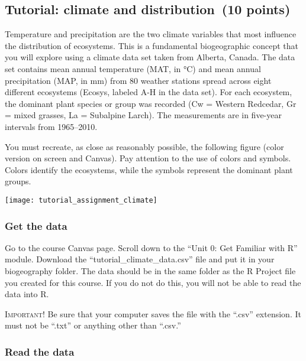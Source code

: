 \documentclass[11pt]{article}
\newcommand{\assignmentTitle}{Tutorial: climate and distribution}
\begin{document}
	\thispagestyle{firstpage}
	
	\subsection*{\assignmentTitle\ (10 points)}
	
	Temperature and precipitation are the two climate variables that most
	influence the distribution of ecosystems. This is a fundamental
	biogeographic concept that you will explore using a climate data set
	taken from Alberta, Canada. The data set contains mean annual
	temperature (MAT, in °C) and mean annual precipitation (MAP, in mm) from
	80 weather stations spread across eight different ecosystems (Ecosys,
	labeled A-H in the data set). For each ecosystem, the dominant plant species or group
	was recorded (Cw = Western Redcedar, Gr = mixed grasses, La = Subalpine
	Larch). The measurements are in five-year intervals from 1965--2010.
	
	You must recreate, as close as reasonably possible, the following figure
	(color version on screen and Canvas). Pay attention to the use of colors and symbols. Colors identify the
	ecosystems, while the symbols represent the dominant plant groups.
	
	\begin{center}
		\texttt{[image: tutorial\_assignment\_climate]}
	\end{center}
	
	
	
	\subsubsection*{Get the data}
	
	Go to the course Canvas page. Scroll down to the “Unit 0: Get Familiar with R” module. Download the “tutorial\_climate\_data.csv” file and put it in your biogeography folder. The data should be in the same folder as the R Project file you created for this course. If you do not do this, you will not be able to read the data into R.
	
	 \textsc{Important!} Be sure that your computer saves the file with the “.csv” extension. It must not be “.txt” or anything other than “.csv.”
	
	
	
	\subsubsection*{Read the data}
	
\end{document}
